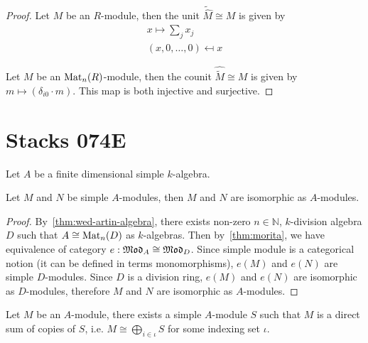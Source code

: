 \begin{proof}
  Let $M$ be an $R$-module, then the unit $\tilde{\hat{M}} \cong M$ is given by
  \[
    \begin{aligned}
      x \mapsto \sum_{j} x_{j} \\
      (x,0,\dots,0) \mapsfrom x
    \end{aligned}
  \]

  Let $M$ be an $\operatorname{Mat}_{n}(R)$-module, then the counit $\hat{\tilde{M}}\cong M$ is given by $m \mapsto (\delta_{i0}\cdot m)$. This map is both injective and surjective.
\end{proof}

\section{Stacks 074E}\label{sec:stacks-074e}

Let $A$ be a finite dimensional simple $k$-algebra.

\begin{lemma}
  Let $M$ and $N$ be simple $A$-modules, then $M$ and $N$ are isomorphic as $A$-modules.
  \leanok
\end{lemma}

\begin{proof}
  By~\cref{thm:wed-artin-algebra}, there exists non-zero $n\in\mathbb N$, $k$-division algebra $D$ such that $A\cong \operatorname{Mat}_{n}(D)$ as $k$-algebras. Then by~\cref{thm:morita}, we have equivalence of category $e : \operatorname{\mathfrak{Mod}}_{A}\cong\operatorname{\mathfrak{Mod}}_{D}$. Since simple module is a categorical notion (it can be defined in terms monomorphisms), $e(M)$ and $e(N)$ are simple $D$-modules. Since $D$ is a division ring, $e(M)$ and $e(N)$ are isomorphic as $D$-modules, therefore $M$ and $N$ are isomorphic as $A$-modules.
\end{proof}

\begin{lemma}
  Let $M$ be an $A$-module, there exists a simple $A$-module $S$ such that $M$ is a direct sum of copies of $S$, i.e. $M \cong \bigoplus_{i \in \iota} S$ for some indexing set $\iota$.
  \leanok
\end{lemma}


